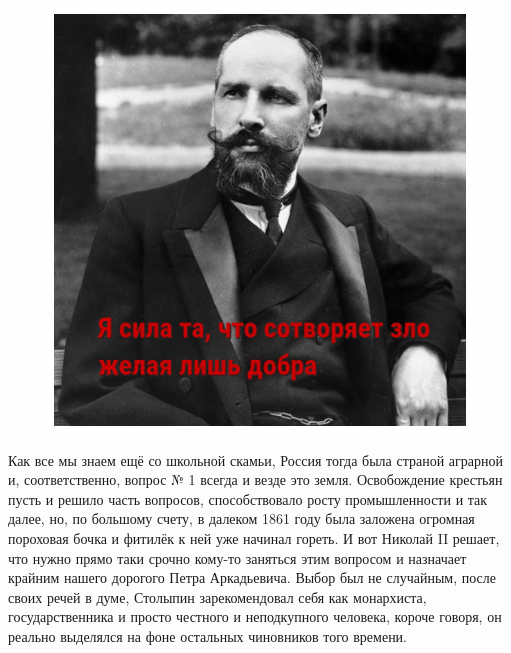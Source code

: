 \begin{figure}[h!tb] 
	\centering\includegraphics[scale=0.5]{Stolypin/UMLzLy9tOI4.jpg}
\end{figure}

Как все мы знаем ещё со школьной скамьи, Россия тогда была страной аграрной и, соответственно, вопрос № 1 всегда и везде это земля. Освобождение крестьян пусть и решило часть вопросов, способствовало росту промышленности и так далее, но, по большому счету, в далеком 1861 году была заложена огромная пороховая бочка и фитилёк к ней уже начинал гореть. И вот Николай II решает, что нужно прямо таки срочно кому-то заняться этим вопросом и назначает крайним нашего дорогого Петра Аркадьевича. Выбор был не случайным, после своих речей в думе, Столыпин зарекомендовал себя как монархиста, государственника и просто честного и неподкупного человека, короче говоря, он реально выделялся на фоне остальных чиновников того времени.


